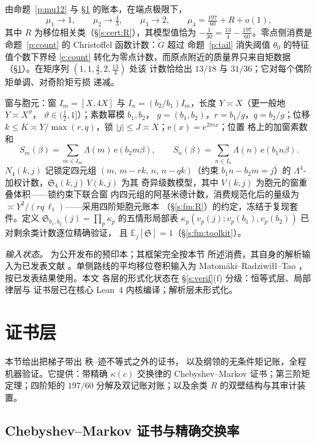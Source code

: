 \documentclass[11pt]{article}
\numberwithin{equation}{section}
\theoremstyle{definition}
\theoremstyle{remark}
\newcommand{\LL}{\Lambda}
\newcommand{\SSS}{\mathfrak{S}}
\newcommand{\e}{\mathrm{e}}
\begin{document}
由命题~\ref{p:mu12} 与 \S\ref{s:cert} 的账本，在端点极限下，
\begin{equation}\label{e:moments}
\mu_1\to1,\qquad \mu_2\to\tfrac43,\qquad \mu_3\to2,\qquad
\mu_4=\tfrac{197}{60}+R+o(1),
\end{equation}
其中 $R$ 为移位相关类（\S\ref{s:cert:R}），其模型值恰为
$-\tfrac1{30}=\tfrac{13}4-\tfrac{197}{60}$。零点侧消费是
命题~\ref{p:count} 的 Christoffel 函数计数：$\widetilde G$ 超过
命题~\ref{p:tail} 消失阈值 $\theta_0$ 的特征值个数下界经
\eqref{e:count} 转化为零点计数，而原点附近的质量界只来自矩数据
（\S\ref{s:cert}）。在矩序列 $(1,1,\tfrac43,2,\tfrac{13}4)$ 处该
计数恰给出 $13/18$ 与 $31/36$；它对每个偶阶矩单调、对奇阶矩亏损
递减。

窗与胞元：窗 $I_m=[X,4X]$ 与 $I_n=(b_2/b_1)I_m$，长度
$Y\asymp X$（更一般地 $Y\asymp X^{\vartheta}$，
$\vartheta\in(\tfrac12,1]$）；素数幂模 $b_1,b_2$，
$g=(b_1,b_2)$，$r=b_1/g$，$q=b_2/g$；位移 $k\le K\asymp
Y/\max(r,q)$，锁 $|j|\le J\asymp X$；$\e(x)=e^{2\pi ix}$；位置
格上的加窗素数和
\[
S_m(\beta)=\sum_{m\in I_m}\LL(m)\,\e(b_2m\beta),
\qquad
S_n(\beta)=\sum_{n\in I_n}\LL(n)\,\e(b_1n\beta).
\]
$N_4(k,j)$ 记锁定四元组 $(m,\,m-rk,\,n,\,n-qk)$（约束
$b_1n-b_2m=j$）的 $\LL^4$-加权计数，$\SSS_4(k,j)\,V(k,j)$ 为其
奇异级数模型，其中 $V(k,j)$ 为胞元的窗重叠体积——锁约束下联合窗
内四元组的阿基米德计数，消费规范化后的量级为
$\asymp Y^{2}/(rq\,\ell_1)$——采用四阶矩胞元账本
（\S\ref{s:fm:R}）的约定，冻结于复现套件。定义
$\SSS_{b_1,b_2}(j)=\prod_p\kappa_p$ 的五情形局部表
$\kappa_p(v_p(j);v_p(b_1),v_p(b_2))$ 已对剩余类计数逐位精确验证，
且 $\mathbb E_j[\SSS]=1$（\S\ref{s:fm:toolkit}）。

\emph{输入状态。}\cite{C26} 为公开发布的预印本；其框架完全按本节
所述消费，其自身的解析输入为已发表文献
\cite{Wei52,IK,Tit86,Mon73,BGST}。单侧路线的平均移位卷积输入为
Matom\"aki--Radziwi\l{}\l--Tao \cite{MRT}，按已发表结果使用。本文
各层的形式化状态在 \S\ref{s:verif}(f) 分级：恒等式层、局部律层与
证书层已在核心 Lean~4 内核编译；解析层未形式化。

\section{证书层}\label{s:cert}

本节给出把梯子带出 \cite[引理~3.2]{C26} 秩--迹不等式之外的证书，
以及纲领的无条件矩记账，全程机器验证。它提供：带精确 $\kappa(c)$
交换律的 Chebyshev--Markov 证书；第三阶矩定理；四阶矩的 $197/60$
分解及双记账对账；以及余类 $R$ 的双壁结构与其审计装置。

\subsection{Chebyshev--Markov 证书与精确交换率}
\end{document}
